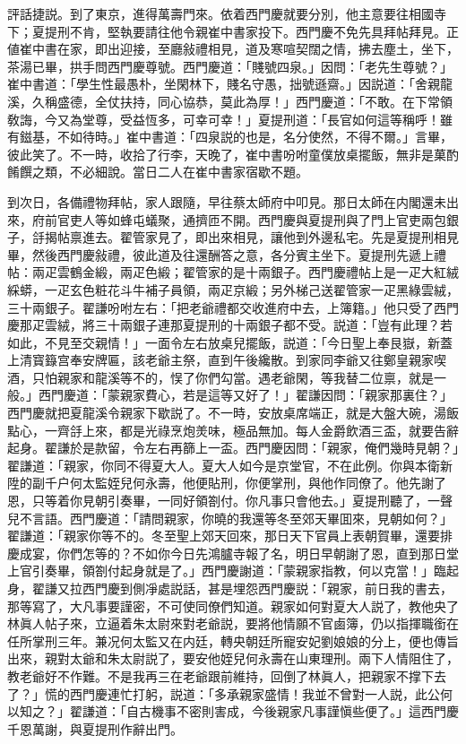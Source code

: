 評話捷説。到了東京，進得萬壽門來。依着西門慶就要分別，他主意要往相國寺下；夏提刑不肯，堅執要請往他令親崔中書家投下。西門慶不免先具拜帖拜見。正値崔中書在家，即出迎接，至廳敍禮相見，道及寒喧契闊之情，拂去塵土，坐下，茶湯已畢，拱手問西門慶尊號。西門慶道：「賤號四泉。」因問：「老先生尊號？」崔中書道：「學生性最愚朴，坐閑林下，賤名守愚，拙號遜齋。」因説道：「舍親龍溪，久稱盛德，全仗扶持，同心協恭，莫此為厚！」西門慶道：「不敢。在下常領敎誨，今又為堂尊，受益恆多，可幸可幸！」夏提刑道：「長官如何這等稱呼！雖有鎡基，不如待時。」崔中書道：「四泉説的也是，名分使然，不得不爾。」言畢，彼此笑了。不一時，收拾了行李，天晚了，崔中書吩咐童僕放桌擺飯，無非是菓酌餚饌之類，不必細說。當日二人在崔中書家宿歇不題。

到次日，各備禮物拜帖，家人跟隨，早往蔡太師府中叩見。那日太師在内閣還未出來，府前官吏人等如蜂屯蟻聚，通擠匝不開。西門慶與夏提刑與了門上官吏兩包銀子，㧱揭帖禀進去。翟管家見了，即出來相見，讓他到外邊私宅。先是夏提刑相見畢，然後西門慶敍禮，彼此道及往還酬答之意，各分賓主坐下。夏提刑先遞上禮帖：兩疋雲鶴金緞，兩疋色緞；翟管家的是十兩銀子。西門慶禮帖上是一疋大紅絨綵蟒，一疋玄色粧花斗牛補子員領，兩疋京緞；另外梯己送翟管家一疋黑綠雲絨，三十兩銀子。翟謙吩咐左右：「把老爺禮都交收進府中去，上簿籍。」他只受了西門慶那疋雲絨，將三十兩銀子連那夏提刑的十兩銀子都不受。説道：「豈有此理？若如此，不見至交親情！」一面令左右放桌兒擺飯，説道：「今日聖上奉艮嶽，新蓋上清寳籙宫奉安牌匾，該老爺主祭，直到午後纔散。到家同李爺又往鄭皇親家喫酒，只怕親家和龍溪等不的，悮了你們勾當。遇老爺閑，等我替二位禀，就是一般。」西門慶道：「蒙親家費心，若是這等又好了！」翟謙因問：「親家那裏住？」西門慶就把夏龍溪令親家下歇説了。不一時，安放桌席端正，就是大盤大碗，湯飯點心，一齊㧱上來，都是光祿烹炮羙味，極品無加。每人金爵飲酒三盃，就要告辭起身。翟謙於是款留，令左右再篩上一盃。西門慶因問：「親家，俺們幾時見朝？」翟謙道：「親家，你同不得夏大人。夏大人如今是京堂官，不在此例。你與本衛新陞的副千户何太監姪兒何永壽，他便貼刑，你便掌刑，與他作同僚了。他先謝了恩，只等着你見朝引奏畢，一同好領劄付。你凡事只會他去。」夏提刑聽了，一聲兒不言語。西門慶道：「請問親家，你曉的我還等冬至郊天畢囬來，見朝如何？」翟謙道：「親家你等不的。冬至聖上郊天回來，那日天下官員上表朝賀畢，還要排慶成宴，你們怎等的？不如你今日先鴻臚寺報了名，明日早朝謝了恩，直到那日堂上官引奏畢，領劄付起身就是了。」西門慶謝道：「蒙親家指教，何以克當！」臨起身，翟謙又拉西門慶到側凈處説話，甚是埋怨西門慶説：「親家，前日我的書去，那等寫了，大凡事要謹密，不可使同僚們知道。親家如何對夏大人説了，教他央了林眞人帖子來，立逼着朱太尉來對老爺説，要將他情願不官鹵簿，仍以指揮職銜在任所掌刑三年。兼况何太監又在内廷，轉央朝廷所寵安妃劉娘娘的分上，便也傳旨出來，親對太爺和朱太尉説了，要安他姪兒何永壽在山東理刑。兩下人情阻住了，教老爺好不作難。不是我再三在老爺跟前維持，回倒了林眞人，把親家不撑下去了？」慌的西門慶連忙打躬，説道：「多承親家盛情！我並不曾對一人説，此公何以知之？」翟謙道：「自古機事不密則害成，今後親家凡事謹愼些便了。」這西門慶千恩萬謝，與夏提刑作辭出門。


